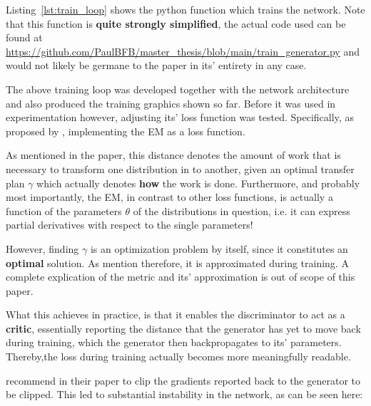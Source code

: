 Listing~\ref{lst:train_loop} shows the python function which trains the network. Note that this function is \textbf{quite strongly simplified}, 
the actual code used can be found at \url{https://github.com/PaulBFB/master_thesis/blob/main/train_generator.py} and would not likely be germane to the paper in its' entirety in any case.

\pagebreak

The above training loop was developed together with the network architecture and also produced the training graphics shown so far. Before it was used in experimentation however, adjusting its' loss function was tested.
Specifically, as proposed by \cite{arjovsky2017wasserstein}, implementing the \ac{EM} as a loss function. 


As mentioned in the paper, this distance denotes the amount of work that is necessary to transform one distribution in to another, given an optimal transfer plan $\gamma$ which actually denotes \textbf{how} the work is done.
Furthermore, and probably most importantly, the \ac{EM}, in contrast to other loss functions, is actually a function of the parameters $\theta$ of the distributions in question, i.e. it can express partial derivatives with respect to the single parameters!

However, finding $\gamma$ is an optimization problem by itself, since it constitutes an \textbf{optimal} solution. As \cite{arjovsky2017wasserstein} mention therefore, it is approximated during training.
A complete explication of the metric and its' approximation is out of scope of this paper.

What this achieves in practice, is that it enables the discriminator to act as a \textbf{critic}, essentially reporting the distance that the generator has yet to move back during training, 
which the generator then backpropagates to its' parameters. Thereby,the loss during training actually becomes more meaningfully readable.

\pagebreak

\cite{arjovsky2017wasserstein} recommend in their paper to clip the gradients reported back to the generator to be clipped. This led to substantial instability in the network, as can be seen here:


